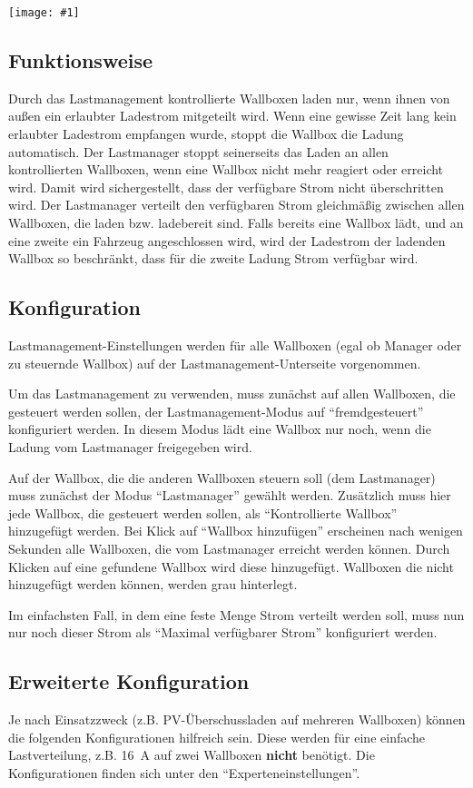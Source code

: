 \documentclass[a4paper,10pt]{article}
\newcommand{\gfx}[1]{\texttt{[image: \#1]}}
\begin{document}
\begin{multicols*}{2}
	\gfx{./img_warp2/resized/web_charge_manager}

	\subsection{Funktionsweise}
	Durch das Lastmanagement kontrollierte Wallboxen laden nur,
	wenn ihnen von außen ein erlaubter Ladestrom mitgeteilt wird. Wenn eine gewisse Zeit lang
	kein erlaubter Ladestrom empfangen wurde, stoppt die Wallbox die Ladung automatisch.
	Der Lastmanager stoppt seinerseits das Laden an allen kontrollierten Wallboxen,
	wenn eine Wallbox nicht mehr reagiert oder erreicht wird. Damit wird sichergestellt,
	dass der verfügbare Strom nicht überschritten wird.
	Der Lastmanager verteilt den verfügbaren Strom gleichmäßig zwischen allen Wallboxen, die laden bzw. ladebereit sind.
	Falls bereits eine Wallbox lädt, und an eine zweite ein Fahrzeug angeschlossen wird,
	wird der Ladestrom der ladenden Wallbox so beschränkt, dass für die zweite Ladung Strom verfügbar wird.

	\subsection{Konfiguration}
	Lastmanagement-Einstellungen werden für alle Wallboxen (egal ob Manager oder zu steuernde Wallbox) auf der
	Lastmanagement-Unterseite vorgenommen.

	Um das Lastmanagement zu verwenden, muss zunächst auf allen Wallboxen, die gesteuert werden sollen,
	der Lastmanagement-Modus auf \enquote{fremdgesteuert} konfiguriert werden.
	In diesem Modus lädt eine Wallbox nur noch, wenn die Ladung vom Lastmanager freigegeben wird.

	Auf der Wallbox, die die anderen Wallboxen steuern soll (dem Lastmanager) muss zunächst der Modus \enquote{Lastmanager} gewählt werden.
	Zusätzlich muss hier jede Wallbox, die gesteuert werden sollen, als \enquote{Kontrollierte Wallbox} hinzugefügt werden.
	Bei Klick auf \enquote{Wallbox hinzufügen} erscheinen nach wenigen Sekunden alle Wallboxen, die vom Lastmanager erreicht werden können.
	Durch Klicken auf eine gefundene Wallbox wird diese hinzugefügt. Wallboxen die nicht hinzugefügt werden können, werden grau hinterlegt.

	Im einfachsten Fall, in dem eine feste Menge Strom verteilt werden soll, muss nun nur noch dieser
	Strom als \enquote{Maximal verfügbarer Strom} konfiguriert werden.

	\subsection{Erweiterte Konfiguration}
	Je nach Einsatzzweck (z.B. PV-Überschussladen auf mehreren Wallboxen) können die folgenden Konfigurationen hilfreich sein.
	Diese werden für eine einfache Lastverteilung, z.B. \SI{16}{\ampere} auf zwei Wallboxen \textbf{nicht} benötigt.
	Die Konfigurationen finden sich unter den \enquote{Experteneinstellungen}.
	\vspace{-0.2cm}

\end{multicols*}
\end{document}
